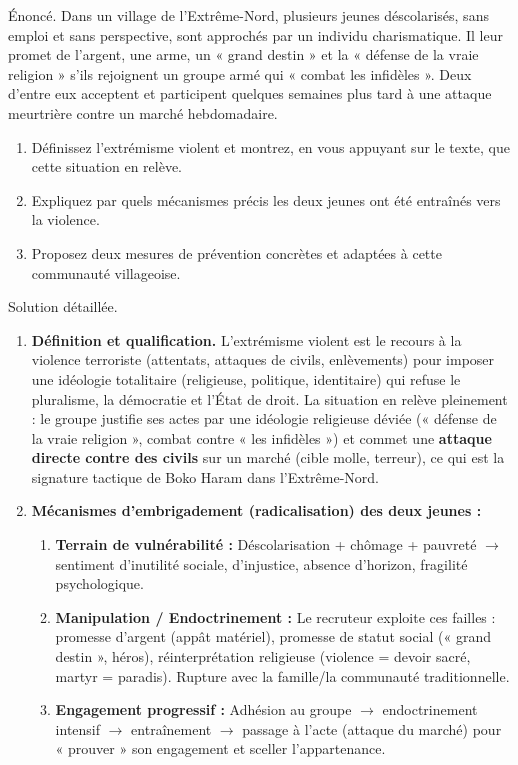\documentclass[11pt]{article}
\begin{document}
\begin{exoresolu}
Énoncé. Dans un village de l'Extrême-Nord, plusieurs jeunes déscolarisés, sans emploi et sans perspective, sont approchés par un individu charismatique. Il leur promet de l'argent, une arme, un « grand destin » et la « défense de la vraie religion » s'ils rejoignent un groupe armé qui « combat les infidèles ». Deux d'entre eux acceptent et participent quelques semaines plus tard à une attaque meurtrière contre un marché hebdomadaire.
\begin{enumerate}
\item Définissez l'extrémisme violent et montrez, en vous appuyant sur le texte, que cette situation en relève.
\item Expliquez par quels mécanismes précis les deux jeunes ont été entraînés vers la violence.
\item Proposez deux mesures de prévention concrètes et adaptées à cette communauté villageoise.
\end{enumerate}
\tcblower
Solution détaillée.
\begin{enumerate}
\item \textbf{Définition et qualification.} L'extrémisme violent est le recours à la violence terroriste (attentats, attaques de civils, enlèvements) pour imposer une idéologie totalitaire (religieuse, politique, identitaire) qui refuse le pluralisme, la démocratie et l'État de droit. La situation en relève pleinement : le groupe justifie ses actes par une idéologie religieuse déviée (« défense de la vraie religion », combat contre « les infidèles ») et commet une \textbf{attaque directe contre des civils} sur un marché (cible molle, terreur), ce qui est la signature tactique de Boko Haram dans l'Extrême-Nord.
\item \textbf{Mécanismes d'embrigadement (radicalisation) des deux jeunes :}
\begin{enumerate}
\item \textbf{Terrain de vulnérabilité :} Déscolarisation + chômage + pauvreté $\rightarrow$ sentiment d'inutilité sociale, d'injustice, absence d'horizon, fragilité psychologique.
\item \textbf{Manipulation / Endoctrinement :} Le recruteur exploite ces failles : promesse d'argent (appât matériel), promesse de statut social (« grand destin », héros), réinterprétation religieuse (violence = devoir sacré, martyr = paradis). Rupture avec la famille/la communauté traditionnelle.
\item \textbf{Engagement progressif :} Adhésion au groupe $\rightarrow$ endoctrinement intensif $\rightarrow$ entraînement $\rightarrow$ passage à l'acte (attaque du marché) pour « prouver » son engagement et sceller l'appartenance.

\end{enumerate}
\end{enumerate}
\end{exoresolu}
\end{document}
